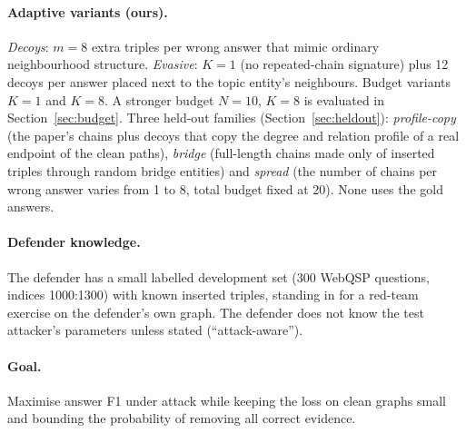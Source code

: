 \documentclass[preprint,12pt]{elsarticle}
\begin{document}
\paragraph{Adaptive variants (ours).} \emph{Decoys}: $m=8$ extra triples per wrong answer that mimic ordinary neighbourhood structure. \emph{Evasive}: $K=1$ (no repeated-chain signature) plus 12 decoys per answer placed next to the topic entity's neighbours. Budget variants $K=1$ and $K=8$. A stronger budget $N=10$, $K=8$ is evaluated in Section~\ref{sec:budget}. Three held-out families (Section~\ref{sec:heldout}): \emph{profile-copy} (the paper's chains plus decoys that copy the degree and relation profile of a real endpoint of the clean paths), \emph{bridge} (full-length chains made only of inserted triples through random bridge entities) and \emph{spread} (the number of chains per wrong answer varies from 1 to 8, total budget fixed at 20). None uses the gold answers.

\paragraph{Defender knowledge.} The defender has a small labelled development set (300 WebQSP questions, indices 1000:1300) with known inserted triples, standing in for a red-team exercise on the defender's own graph. The defender does not know the test attacker's parameters unless stated (``attack-aware'').

\paragraph{Goal.} Maximise answer F1 under attack while keeping the loss on clean graphs small and bounding the probability of removing all correct evidence.
\end{document}
